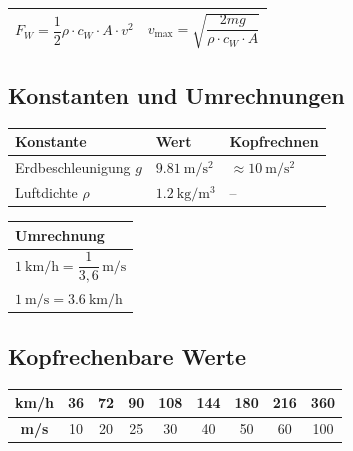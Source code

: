 \documentclass[11pt, a4paper]{article}
\begin{document}
\begin{formelbox}[title=Luftwiderstand (zur Information)]
\begin{center}
\renewcommand{\arraystretch}{1.8}
\begin{tabular}{|c|c|}
\hline
$F_W = \dfrac{1}{2} \rho \cdot c_W \cdot A \cdot v^2$ & $v_{\text{max}} = \sqrt{\dfrac{2mg}{\rho \cdot c_W \cdot A}}$ \\
\hline
\end{tabular}
\end{center}
\end{formelbox}

\subsection{Konstanten und Umrechnungen}

\begin{center}
\begin{tabular}{|l|l|l|}
\hline
\textbf{Konstante} & \textbf{Wert} & \textbf{Kopfrechnen} \\
\hline
Erdbeschleunigung $g$ & $\SI{9,81}{\metre\per\second\squared}$ & $\approx \SI{10}{\metre\per\second\squared}$ \\
Luftdichte $\rho$ & $\SI{1,2}{\kilo\gram\per\metre\cubed}$ & -- \\
\hline
\end{tabular}
\hspace{1cm}
\begin{tabular}{|l|}
\hline
\textbf{Umrechnung} \\
\hline
$\SI{1}{\kilo\metre\per\hour} = \dfrac{1}{3{,}6}\,\si{\metre\per\second}$ \\[0.5em]
$\SI{1}{\metre\per\second} = \SI{3,6}{\kilo\metre\per\hour}$ \\
\hline
\end{tabular}
\end{center}

\subsection{Kopfrechenbare Werte}

\begin{center}
\begin{tabular}{|c|c|c|c|c|c|c|c|c|}
\hline
\textbf{km/h} & 36 & 72 & 90 & 108 & 144 & 180 & 216 & 360 \\
\hline
\textbf{m/s} & 10 & 20 & 25 & 30 & 40 & 50 & 60 & 100 \\
\hline
\end{tabular}
\end{center}
\end{document}
